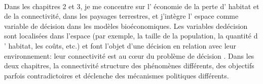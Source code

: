 \begin{displayquote}
\begin{displayquote}
\begin{displayquote}
{{{\\

  Dans les chapitres 2 et 3, je me concentre sur l' économie de la perte d' habitat et de la connectivité, dans les paysages terrestres, et j'intègre l' espace comme variable de décision dans les modèles bioéconomiques. Les variables dedécision sont localisées dans l'espace (par exemple, la taille de la population, la quantité d ' habitat, les coûts, etc.) et font l'objet d'une décision en relation avec leur environnement: leur connectivité est au cœur du problème de décision . Dans les deux chapitres, la connectivité structure des phénomènes différents, des objectifs parfois contradictoires et déclenche des mécanismes politiques différents. \\



\begin{table}[H]
\centering
{}
\caption{Thematic divides of chapters}
\end{table}

}}}
\end{displayquote}
\end{displayquote}
\end{displayquote}
